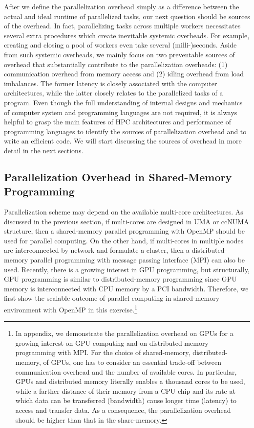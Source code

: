 \documentclass[12pt]{article}
\begin{document}
After we define the parallelization overhead simply as a difference between the actual and ideal runtime of parallelized tasks, our next question should be sources of the overhead. In fact, parallelizing tasks across multiple workers necessitates several extra procedures which create inevitable systemic overheads. For example, creating and closing a pool of workers even take several (milli-)seconds. Aside from such systemic overheads, we mainly focus on two preventable sources of overhead that substantially contribute to the parallelization overheads: (1) communication overhead from memory access and (2) idling overhead from load imbalances. The former latency is closely associated with the computer architectures, while the latter closely relates to the parallelized tasks of a program. Even though the full understanding of internal designs and mechanics of computer system and programming languages are not required, it is always helpful to grasp the main features of HPC architectures and performance of programming languages to identify the sources of parallelization overhead and to write an efficient code. We will start discussing the sources of overhead in more detail in the next sections.



\subsection{Parallelization Overhead in Shared-Memory Programming}
Parallelization scheme may depend on the available multi-core architectures. As discussed in the previous section, if multi-cores are designed in UMA or ccNUMA structure, then a shared-memory parallel programming with OpenMP should be used for parallel computing. On the other hand, if multi-cores in multiple nodes are interconnected by network and formulate a cluster, then a distributed-memory parallel programming with message passing interface (MPI) can also be used. Recently, there is a growing interest in GPU programming, but structurally, GPU programming is similar to distributed-memory programming since GPU memory is interconnected with CPU memory by a PCI bandwidth. Therefore, we first show the scalable outcome of parallel computing in shared-memory environment with OpenMP in this exercise.\footnote{\sf In appendix, we demonstrate the parallelization overhead on GPUs for a growing interest on GPU computing and on distributed-memory programming with MPI. For the choice of shared-memory, distributed-memory, of GPUs, one has to consider an essential trade-off between communication overhead and the number of available cores. In particular, GPUs and distributed memory literally enables a thousand cores to be used, while a farther distance of their memory from a CPU chip and its rate at which data can be transferred (bandwidth) cause longer time (latency) to access and transfer data. As a consequence, the parallelization overhead should be higher than that in the share-memory.}
\end{document}
